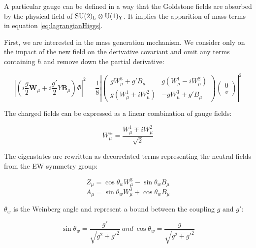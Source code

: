      A particular gauge can be defined in a way that the Goldstone fields are absorbed by the physical field of $\rm{SU}(2)_{\rm{L}} \otimes \rm{U}(1)_{\rm{Y}}$.
      It implies the apparition of mass terms in equation \ref{eq:lagrangianHiggs}.

      First, we are interested in the mass generation mechanism.
      We consider only on the impact of the new field on the derivative covariant and omit any terms containing $h$ and remove down the partial derivative:

      \begin{equation}
        \left|\left(i\frac{g}{2}\textbf{W}_{\mu} +i\frac{g'}{2}Y\textbf{B}_{\mu}\right) \Phi \right|^2 = \frac{1}{8}\left|
                \begin{pmatrix}
                   gW^3_{\mu} +g'B_{\mu} & g(W^1_{\mu} - i W^2_{\mu}) \\
                   g(W^1_{\mu} + i W^2_{\mu}) & - g W^3_{\mu} + g'B_{\mu}
                \end{pmatrix}
                \begin{pmatrix}
                  0 \\
                  v
                \end{pmatrix}
           \right|^2
        \label{eq:derHiggs}
      \end{equation}

      The charged fields can be expressed as a linear combination of gauge fields:

      \begin{equation}
        W^{\pm}_{\mu} = \frac{W^1_{\mu} \mp iW^2_{\mu}}{\sqrt{2}}
      \end{equation}

      The eigenstates are rewritten as decorrelated terms representing the neutral fields from the EW symmetry group:

      \begin{equation}
        Z_{\mu} = \cos{\theta_{w}W^3_{\mu}} - \sin{\theta_{w}B_{\mu}}
      \end{equation}
      \begin{equation}
        A_{\mu} = \sin{\theta_{w}W^3_{\mu}} + \cos{\theta_{w}B_{\mu}}
      \end{equation}

     $\theta_{w}$ is the Weinberg angle and represent a bound between the coupling $g$ and $g'$:
     
     \begin{equation}
     \sin{\theta_{w}} = \frac{g'}{\sqrt{g^2+g'^2}} \ and \ \cos{\theta_{w}} = \frac{g}{\sqrt{g^2+g'^2}}
     \end{equation} 

